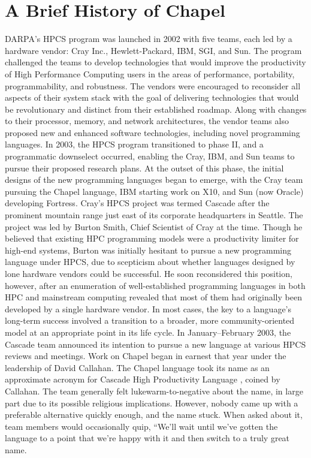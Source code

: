 \documentclass[letterpaper]{article}
\begin{document}
\section{ A Brief History of Chapel}

DARPA’s HPCS program was launched in 2002 with five teams, each led by a hardware vendor: Cray Inc., Hewlett-Packard, IBM, SGI, and Sun. The program challenged the teams to develop technologies that would improve the productivity of High Performance Computing users in the areas of performance, portability, programmability, and robustness. The vendors were encouraged to reconsider all aspects of their system stack with the goal of delivering technologies that would be revolutionary and distinct from their established roadmap. Along with changes to their processor, memory, and network architectures, the vendor teams also proposed new and enhanced software technologies, including novel programming languages. In 2003, the HPCS program transitioned to phase II, and a programmatic downselect occurred, enabling the Cray, IBM, and Sun teams to pursue their proposed research plans. At the outset of this phase, the initial designs of the new programming languages began to emerge, with the Cray team pursuing the Chapel language, IBM starting work on X10, and Sun (now Oracle) developing Fortress. Cray’s HPCS project was termed Cascade after the prominent mountain range just east of its corporate headquarters in Seattle. The project was led by Burton Smith, Chief Scientist of Cray at the time. Though he believed that existing HPC programming models were a productivity limiter for high-end systems, Burton was initially hesitant to pursue a new programming language under HPCS, due to scepticism about whether languages designed by lone hardware vendors could be successful. He soon reconsidered this position, however, after an enumeration of well-established programming languages in both HPC and mainstream computing revealed that most of them had originally been developed by a single hardware vendor. In most cases, the key to a language’s long-term success involved a transition to a broader, more community-oriented model at an appropriate point in its life cycle. In January–February 2003, the Cascade team announced its intention to pursue a new language at various HPCS reviews and meetings. Work on Chapel began in earnest that year under the leadership of David Callahan. The Chapel language took its name as an approximate acronym for Cascade High Productivity Language
, coined by Callahan. The team generally felt lukewarm-to-negative about the name, in large part due to its possible religious implications. However, nobody came up with a preferable alternative quickly enough, and the name stuck. When asked about it, team members would occasionally quip, “We’ll wait until we’ve gotten the language to a point that we’re happy with it and then switch to a truly great name.
\end{document}
